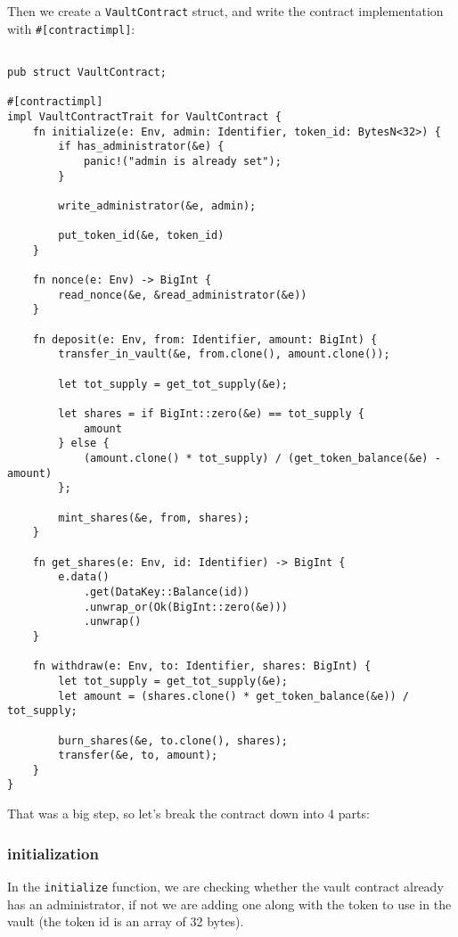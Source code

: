 \documentclass{article}
\newcommand{\inl}[1]{\lstinline{#1}}
\begin{document}
Then we create a \inl{VaultContract} struct, and write the contract implementation with \inl{#[contractimpl]}:

\begin{lstlisting}

pub struct VaultContract;

#[contractimpl]
impl VaultContractTrait for VaultContract {
    fn initialize(e: Env, admin: Identifier, token_id: BytesN<32>) {
        if has_administrator(&e) {
            panic!("admin is already set");
        }

        write_administrator(&e, admin);

        put_token_id(&e, token_id)
    }

    fn nonce(e: Env) -> BigInt {
        read_nonce(&e, &read_administrator(&e))
    }

    fn deposit(e: Env, from: Identifier, amount: BigInt) {
        transfer_in_vault(&e, from.clone(), amount.clone());

        let tot_supply = get_tot_supply(&e);

        let shares = if BigInt::zero(&e) == tot_supply {
            amount
        } else {
            (amount.clone() * tot_supply) / (get_token_balance(&e) - amount)
        };

        mint_shares(&e, from, shares);
    }

    fn get_shares(e: Env, id: Identifier) -> BigInt {
        e.data()
            .get(DataKey::Balance(id))
            .unwrap_or(Ok(BigInt::zero(&e)))
            .unwrap()
    }

    fn withdraw(e: Env, to: Identifier, shares: BigInt) {
        let tot_supply = get_tot_supply(&e);
        let amount = (shares.clone() * get_token_balance(&e)) / tot_supply;

        burn_shares(&e, to.clone(), shares);
        transfer(&e, to, amount);
    }
}

\end{lstlisting}

That was a big step, so let's break the contract down into 4 parts:

\subsubsection{initialization}
In the \inl{initialize} function, we are checking whether the vault contract already has an administrator, if not we are adding one along with the token to use in the vault (the token id is an array of 32 bytes).
\end{document}
